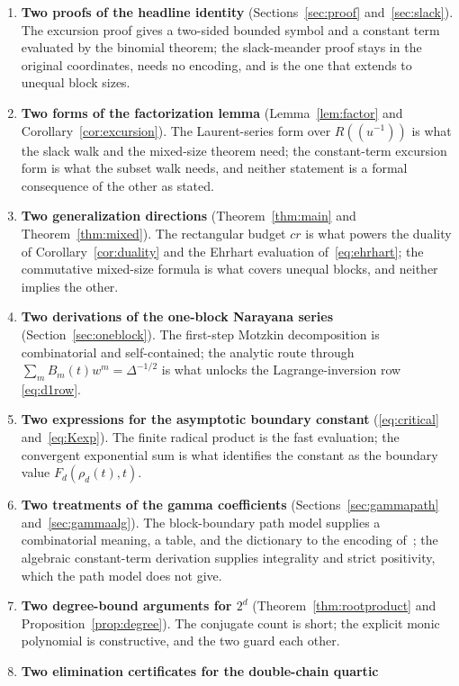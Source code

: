\documentclass[11pt]{article}
\numberwithin{equation}{section}
\theoremstyle{definition}
\begin{document}
\begin{enumerate}[leftmargin=1.5em,itemsep=0.25em]
\item \textbf{Two proofs of the headline identity}
 (Sections~\ref{sec:proof} and~\ref{sec:slack}). The excursion proof gives a
 two-sided bounded symbol and a constant term evaluated by the binomial
 theorem; the slack-meander proof stays in the original coordinates, needs no
 encoding, and is the one that extends to unequal block sizes.
\item \textbf{Two forms of the factorization lemma}
 (Lemma~\ref{lem:factor} and Corollary~\ref{cor:excursion}). The Laurent-series
 form over $R((u^{-1}))$ is what the slack walk and the mixed-size theorem
 need; the constant-term excursion form is what the subset walk needs, and
 neither statement is a formal consequence of the other as stated.
\item \textbf{Two generalization directions} (Theorem~\ref{thm:main} and
 Theorem~\ref{thm:mixed}). The rectangular budget $cr$ is what powers the
 duality of Corollary~\ref{cor:duality} and the Ehrhart evaluation
 of~\eqref{eq:ehrhart}; the commutative mixed-size formula is what covers
 unequal blocks, and neither implies the other.
\item \textbf{Two derivations of the one-block Narayana series}
 (Section~\ref{sec:oneblock}). The first-step Motzkin decomposition is
 combinatorial and self-contained; the analytic route through
 $\sum_mB_m(t)w^m=\Delta^{-1/2}$ is what unlocks the Lagrange-inversion row
 \eqref{eq:d1row}.
\item \textbf{Two expressions for the asymptotic boundary constant}
 (\eqref{eq:critical} and~\eqref{eq:Kexp}). The finite radical product is the
 fast evaluation; the convergent exponential sum is what identifies the
 constant as the boundary value $F_d(\rho_d(t),t)$.
\item \textbf{Two treatments of the gamma coefficients}
 (Sections~\ref{sec:gammapath} and~\ref{sec:gammaalg}). The block-boundary
 path model supplies a combinatorial meaning, a table, and the dictionary to
 the encoding of~\cite{A}; the algebraic constant-term derivation supplies
 integrality and strict positivity, which the path model does not give.
\item \textbf{Two degree-bound arguments for $2^d$}
 (Theorem~\ref{thm:rootproduct} and Proposition~\ref{prop:degree}). The
 conjugate count is short; the explicit monic polynomial is constructive, and
 the two guard each other.
\item \textbf{Two elimination certificates for the double-chain quartic}

\end{enumerate}
\end{document}
